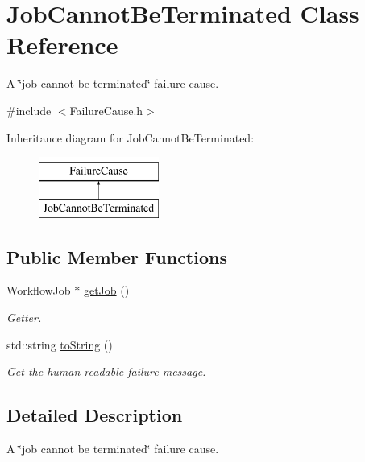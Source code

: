 \hypertarget{class_job_cannot_be_terminated}{}\section{Job\+Cannot\+Be\+Terminated Class Reference}
\label{class_job_cannot_be_terminated}


A \char`\"{}job cannot be terminated\char`\"{} failure cause.  




{\ttfamily \#include $<$Failure\+Cause.\+h$>$}

Inheritance diagram for Job\+Cannot\+Be\+Terminated\+:\begin{figure}[H]
\begin{center}
\leavevmode
\includegraphics[height=2.000000cm]{class_job_cannot_be_terminated}
\end{center}
\end{figure}
\subsection*{Public Member Functions}
\begin{DoxyCompactItemize}
\item 
Workflow\+Job $\ast$ \hyperlink{class_job_cannot_be_terminated_a700ef0cdfff8ac9ef5fbf05b23eb5330}{get\+Job} ()
\begin{DoxyCompactList}\small\item\em Getter. \end{DoxyCompactList}\item 
std\+::string \hyperlink{class_job_cannot_be_terminated_a25157a936fc9676aac686d4063f95082}{to\+String} ()
\begin{DoxyCompactList}\small\item\em Get the human-\/readable failure message. \end{DoxyCompactList}\end{DoxyCompactItemize}


\subsection{Detailed Description}
A \char`\"{}job cannot be terminated\char`\"{} failure cause. 

